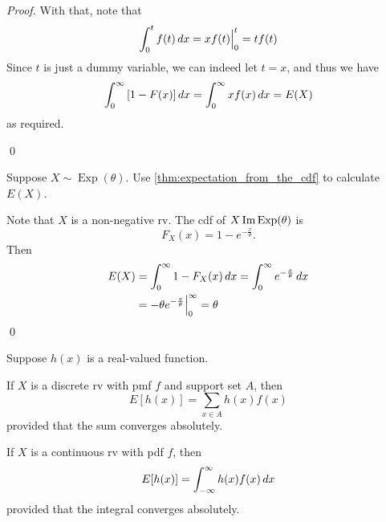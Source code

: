 \documentclass[notoc,notitlepage]{tufte-book}
\DeclareMathOperator{\Exp}{Exp }
\begin{document}
\begin{proof}
  With that, note that
  \begin{equation*}
    \int_{0}^{t} f(t) \mathop{}\!d{x} = x f(t) \Big|_{0}^{t} = tf(t)
  \end{equation*}
  Since $t$ is just a dummy variable, we can indeed let $t = x$, and thus we have
  \begin{equation*}
    \int_{0}^{\infty} \left[ 1 - F(x) \right] \mathop{}\!d{x} = \int_{0}^{\infty} xf(x) \mathop{}\!d{x} = E(X)
  \end{equation*}
  as required.

  \qed
\end{proof}

\begin{eg}[Example 2.20]
  Suppose $X \sim \Exp(\theta)$. Use \cref{thm:expectation_from_the_cdf} to calculate $E(X)$.

  \begin{solution}
    Note that $X$ is a non-negative rv. The cdf of $X \im \Exp(\theta)$ is
    \begin{equation*}
      F_X (x) = 1 - e^{-\frac{x}{\theta}}.
    \end{equation*}
    Then
    \begin{align*}
      E(X) &= \int_{0}^{\infty} 1 - F_X(x) \mathop{}\!d{x} = \int_{0}^{\infty} e^{-\frac{x}{\theta}} \mathop{}\!d{x} \\
           &= -\theta e^{-\frac{x}{\theta}} \Big|_{0}^{\infty} = \theta
    \end{align*}\qed
  \end{solution}
\end{eg}

\begin{thm}
\label{thm:expected_value_of_a_function_of_x}
  Suppose $h(x)$ is a real-valued function.

  If $X$ is a discrete rv with pmf $f$ and support set $A$, then
  \begin{equation}\label{eq:discrete_function_to_expectation}
    E[ h(x) ] = \sum_{x \in A} h(x) f(x)
  \end{equation}
  provided that the sum converges absolutely.

  If $X$ is a continuous rv with pdf $f$, then
  \begin{equation}\label{eq:continous_function_to_expectation}
    E[ h(x) ] = \int_{-\infty}^{\infty} h(x) f(x) \mathop{}\!d{x}
  \end{equation}
  provided that the integral converges absolutely.
\end{thm}
\end{document}
